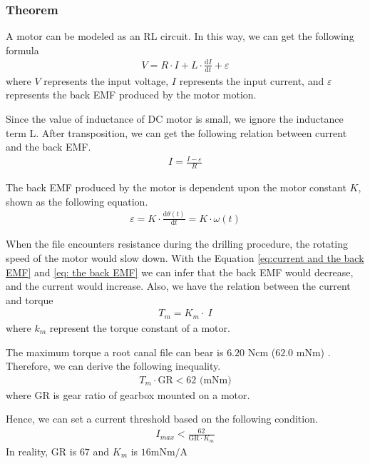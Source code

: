 \subsubsection{Theorem}
\hspace*{6mm}A motor can be modeled as an RL circuit. In this way, we can get the following formula 
\begin{equation}
\begin{split}
V = R \cdot I + L  \cdot \frac{\mathrm{d}I}{\mathrm{d}t} + \varepsilon
\end{split}
\end{equation}
where $V$ represents the input voltage, $I$ represents the input current, and $\varepsilon $ represents the back EMF produced by the motor motion.
\par
Since the value of inductance of DC motor is small, we ignore the inductance term L. After transposition, we can get the following relation between current and the back EMF.
\begin{equation}
\label{eq:current and the back EMF}
\begin{split}
I = \frac{I - \varepsilon}{R}
\end{split}
\end{equation}
\par\noindent
The back EMF produced by the motor is dependent upon the motor constant $K$, shown as the following equation.
\begin{equation}
\label{eq: the back EMF}
\begin{split}
\varepsilon  = K \cdot \frac{\mathrm{d}\theta (t)}{\mathrm{d}t} = K \cdot \omega (t)
\end{split}
\end{equation}
\par
When the file encounters resistance during the drilling procedure, the rotating speed of the motor would slow down. With the Equation \ref{eq:current and the back EMF} and \ref{eq: the back EMF} we can infer that the back EMF would decrease, and the current would increase.
Also, we have the relation between the current and torque
\begin{equation}
\begin{split}
T_m = K_m  \cdot \ I
\end{split}
\end{equation}
where $k_m$ represent the torque constant of a motor.
\par\noindent
The maximum torque a root canal file can bear is $6.20$ Ncm ($62.0$ mNm) \cite{boessler2009effect}. Therefore, we can derive the following inequality.
\begin{equation}
\begin{split}
T_m \cdot \mathrm{GR} < 62 \text{ (mNm)}
\end{split}
\end{equation}
where $\mathrm{GR}$ is gear ratio of gearbox mounted on a motor.
\par
Hence, we can set a current threshold based on the following condition. 
\begin{equation}
\begin{split}
I_{max} < \frac{62}{\mathrm{GR} \cdot K_m}
\end{split}
\end{equation} 
In reality, $\mathrm{GR}$ is $67$ and $K_m$ is $16 \text{mNm/A}$
